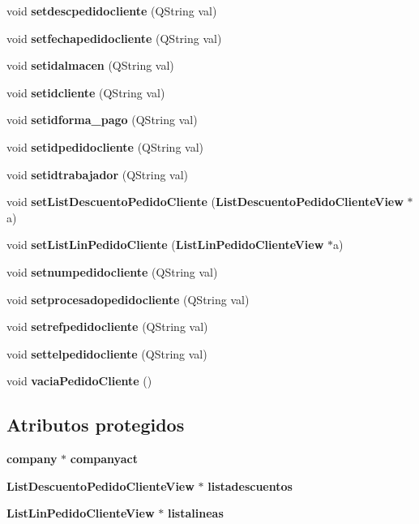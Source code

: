 \begin{CompactItemize}
\item 
void {\bf setdescpedidocliente} (QString val)\label{classPedidoCliente_a30}

\item 
void {\bf setfechapedidocliente} (QString val)\label{classPedidoCliente_a31}

\item 
void {\bf setidalmacen} (QString val)\label{classPedidoCliente_a32}

\item 
void {\bf setidcliente} (QString val)\label{classPedidoCliente_a33}

\item 
void {\bf setidforma\_\-pago} (QString val)\label{classPedidoCliente_a34}

\item 
void {\bf setidpedidocliente} (QString val)\label{classPedidoCliente_a35}

\item 
void {\bf setidtrabajador} (QString val)\label{classPedidoCliente_a36}

\item 
void {\bf set\-List\-Descuento\-Pedido\-Cliente} ({\bf List\-Descuento\-Pedido\-Cliente\-View} $\ast$a)\label{classPedidoCliente_a37}

\item 
void {\bf set\-List\-Lin\-Pedido\-Cliente} ({\bf List\-Lin\-Pedido\-Cliente\-View} $\ast$a)\label{classPedidoCliente_a38}

\item 
void {\bf setnumpedidocliente} (QString val)\label{classPedidoCliente_a39}

\item 
void {\bf setprocesadopedidocliente} (QString val)\label{classPedidoCliente_a40}

\item 
void {\bf setrefpedidocliente} (QString val)\label{classPedidoCliente_a41}

\item 
void {\bf settelpedidocliente} (QString val)\label{classPedidoCliente_a42}

\item 
void {\bf vacia\-Pedido\-Cliente} ()\label{classPedidoCliente_a43}

\end{CompactItemize}
\subsection*{Atributos protegidos}
\begin{CompactItemize}
\item 
{\bf company} $\ast$ {\bf companyact}\label{classPedidoCliente_p0}

\item 
{\bf List\-Descuento\-Pedido\-Cliente\-View} $\ast$ {\bf listadescuentos}\label{classPedidoCliente_p1}

\item 
{\bf List\-Lin\-Pedido\-Cliente\-View} $\ast$ {\bf listalineas}\label{classPedidoCliente_p2}

\end{CompactItemize}


